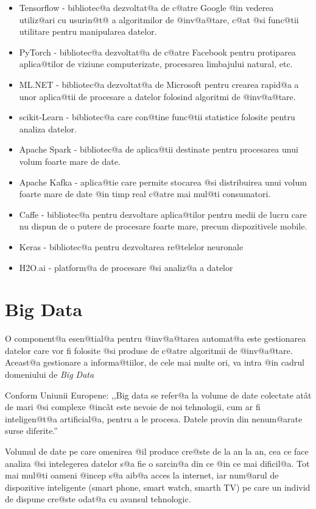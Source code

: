 \begin{itemize}
	\item Tensorflow - bibliotec@a dezvoltat@a de c@atre Google @in vederea utiliz@ari cu usurin@t@ a algoritmilor de @inv@a@tare, c@at @si func@tii utilitare pentru manipularea datelor.
	\item PyTorch - bibliotec@a dezvoltat@a de c@atre Facebook pentru protiparea aplica@tilor de viziune computerizate, procesarea limbajului natural, etc.
	\item ML.NET - bibliotec@a dezvoltat@a de Microsoft pentru crearea rapid@a a unor aplica@tii de procesare a datelor folosind algoritmi de @inv@a@tare.
	\item scikit-Learn - bibliotec@a care con@tine func@tii statistice folosite pentru analiza datelor.
	\item Apache Spark - bibliotec@a de aplica@tii destinate pentru procesarea unui volum foarte mare de date.
	\item Apache Kafka - aplica@tie care permite stocarea @si distribuirea unui volum foarte mare de date @in timp real c@atre mai mul@ti consumatori.
	\item Caffe - bibliotec@a pentru dezvoltare aplica@tilor pentru medii de lucru care nu dispun de o putere de procesare foarte mare, precum dispozitivele mobile.
	\item Keras - bibliotec@a pentru dezvoltarea re@telelor neuronale
	\item H2O.ai - platform@a de procesare @si analiz@a a datelor
	
\end{itemize}

\section{Big Data}


O component@a esen@tial@a pentru @inv@a@tarea automat@a este gestionarea datelor care vor fi folosite @si produse de c@atre algoritmii de @inv@a@tare. Aceast@a gestionare a informa@tiilor, de cele mai multe ori, va intra @in cadrul domeniului de {\sl Big Data }

Conform Uniunii Europene: ,,Big data se refer@a la volume de date colectate at\^ at de mari @si complexe @inc\^ at este nevoie de noi tehnologii, cum ar fi inteligen@t@a artificial@a, pentru a le procesa. Datele provin din nenum@arate surse diferite.''\cite{eu-big-data-definition}

Volumul de date pe care omenirea @il produce cre@ste de la an la an, cea ce face  analiza @si intelegerea datelor s@a fie o sarcin@a din ce @in ce mai dificil@a. Tot mai mul@ti oameni @incep s@a aib@a acces la internet, iar num@arul de dispozitive inteligente (smart phone, smart watch, smarth TV) pe care un individ de dispune cre@ste odat@a cu avansul tehnologic.


